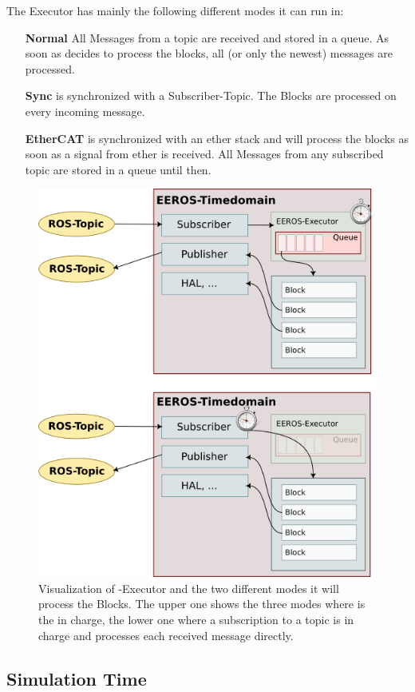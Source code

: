 The Executor has mainly the following different modes it can run in:

\begin{itemize}
    \item[\textbf{Normal}] All Messages from a \Gls{topic} are received and stored in a queue. As soon as  decides to process the blocks, all (or only the newest) messages are processed.
    \item[\textbf{Sync}]  is synchronized with a Subscriber-Topic. The Blocks are processed on every incoming message.
    \item[\textbf{EtherCAT}]  is synchronized with an \Gls{ether} stack and will process the blocks as soon as a signal from \Gls{ether} is received. All Messages from any subscribed \gls{topic} are stored in a queue until then.
\end{itemize}

\begin{figure}[H]
    \centering
    \includegraphics[width=0.6\linewidth]{images/eeros-executor}
    \caption[ Overview]{Visualization of -Executor and the two different modes it will process the Blocks. The upper one shows the three modes where  is the in charge, the lower one where a subscription to a topic is in charge and processes each received message directly.}
    \label{fig:eeros-overview}
\end{figure}


\subsection[Simulation time]{Simulation Time} \label{sec:simulation-time}

